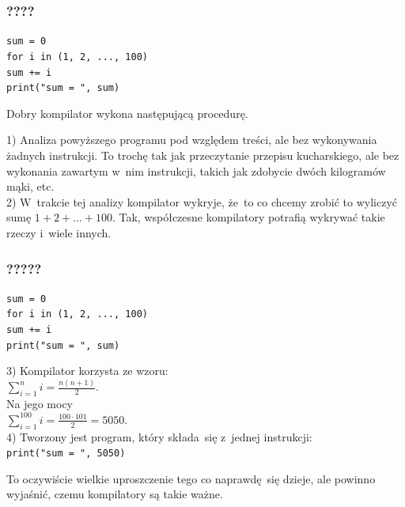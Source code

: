 \documentclass[10pt,t]{beamer}
\begin{document}
\begin{frame}
  \frametitle{????}


  \texttt{sum = 0} \\

  \texttt{for i in (1, 2, ..., 100)} \\
  \hphantom{aaaa} \texttt{sum += i} \\

  \texttt{print("sum = ", sum)}

  Dobry kompilator wykona następującą procedurę.

  1) Analiza powyższego programu pod względem treści, ale \alert{bez}
  wykonywania żadnych instrukcji. To trochę tak jak przeczytanie przepisu
  kucharskiego, ale bez wykonania zawartym w~nim instrukcji, takich
  jak zdobycie dwóch kilogramów mąki, etc. \\
  2) W~trakcie tej analizy kompilator wykryje, że~to co chcemy
  zrobić to wyliczyć sumę $1 + 2 + \ldots + 100$. Tak, współczesne kompilatory
  potrafią wykrywać takie rzeczy i~wiele innych.

\end{frame}





\begin{frame}
  \frametitle{?????}


  \texttt{sum = 0} \\

  \texttt{for i in (1, 2, ..., 100)} \\
  \hphantom{aaaa} \texttt{sum += i} \\

  \texttt{print("sum = ", sum)}

  3) Kompilator korzysta ze wzoru: \\[0.3em]
  $\displaystyle \sum_{ i = 1 }^{ n } i = \frac{ n ( n + 1 ) }{ 2 }$. \\[0.5em]
  Na jego mocy \\[0.3em]
  $\displaystyle \sum_{ i = 1 }^{ 100 } i = \frac{ 100 \cdot 101 }{ 2 } = 5050$.
  \\[0.5em]
  4) Tworzony jest program, który składa~się z~jednej instrukcji: \\
  \texttt{print("sum = ", 5050)}

  To oczywiście wielkie uproszczenie tego co naprawdę~się dzieje,
  ale powinno wyjaśnić, czemu kompilatory są takie ważne.

\end{frame}
\end{document}
